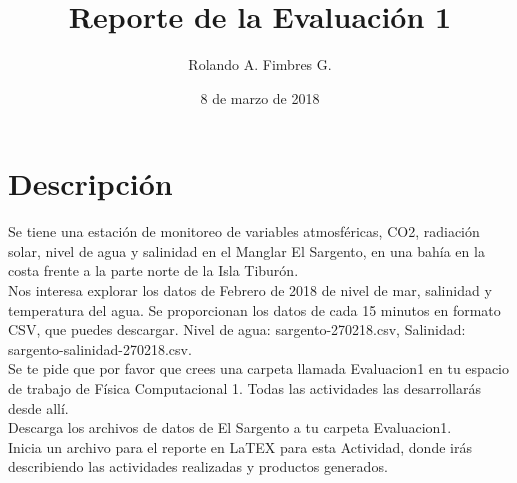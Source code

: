 \documentclass{article}
\title{Reporte de la Evaluación 1}
\author{Rolando A. Fimbres G.}
\date{8 de marzo de 2018}
\begin{document}
\maketitle
\section{Descripción}
Se tiene una estación de monitoreo de variables atmosféricas, CO2, radiación solar, nivel de agua y salinidad en el Manglar El Sargento, en una bahía en la costa frente a la parte norte de la Isla Tiburón.\\
Nos interesa explorar los datos de Febrero de 2018 de nivel de mar, salinidad y temperatura del agua. Se proporcionan los datos de cada 15 minutos en formato CSV, que puedes descargar. Nivel de agua: sargento-270218.csv, Salinidad: sargento-salinidad-270218.csv.\\
Se te pide que por favor que crees una carpeta llamada Evaluacion1 en tu espacio de trabajo de Física Computacional 1. Todas las actividades las desarrollarás desde allí.\\
Descarga los archivos de datos de El Sargento a tu carpeta Evaluacion1.\\
Inicia un archivo para el reporte en LaTEX para esta Actividad, donde irás describiendo las actividades realizadas y productos generados.\\
\end{document}
